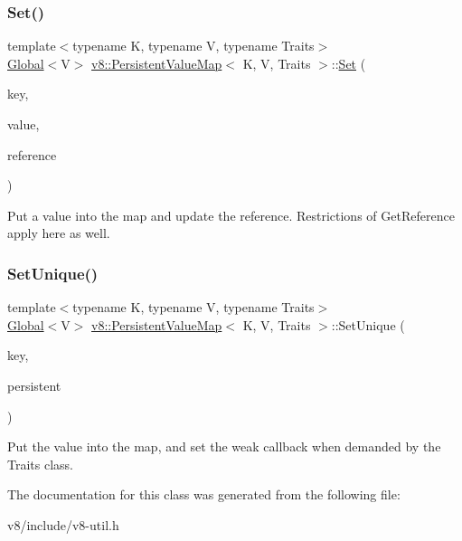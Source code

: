 \subsubsection{\texorpdfstring{Set()}{Set()}\hspace{0.1cm}{\footnotesize\ttfamily [3/3]}}
{\footnotesize\ttfamily template$<$typename K, typename V, typename Traits$>$ \\
\mbox{\hyperlink{classv8_1_1Global}{Global}}$<$V$>$ \mbox{\hyperlink{classv8_1_1PersistentValueMap}{v8\+::\+Persistent\+Value\+Map}}$<$ K, V, Traits $>$\+::\mbox{\hyperlink{classv8_1_1Set}{Set}} (\begin{DoxyParamCaption}\item[{const K \&}]{key,  }\item[{\mbox{\hyperlink{classv8_1_1Global}{Global}}$<$ V $>$}]{value,  }\item[{\mbox{\hyperlink{classv8_1_1PersistentValueMapBase_1_1PersistentValueReference}{Persistent\+Value\+Reference}} $\ast$}]{reference }\end{DoxyParamCaption})\hspace{0.3cm}{\ttfamily [inline]}}

Put a value into the map and update the reference. Restrictions of Get\+Reference apply here as well. \mbox{\label{classv8_1_1PersistentValueMap_a97ab74c7670e65dd5f95ec2940c4ab11}} 
\subsubsection{\texorpdfstring{Set\+Unique()}{SetUnique()}}
{\footnotesize\ttfamily template$<$typename K, typename V, typename Traits$>$ \\
\mbox{\hyperlink{classv8_1_1Global}{Global}}$<$V$>$ \mbox{\hyperlink{classv8_1_1PersistentValueMap}{v8\+::\+Persistent\+Value\+Map}}$<$ K, V, Traits $>$\+::Set\+Unique (\begin{DoxyParamCaption}\item[{const K \&}]{key,  }\item[{\mbox{\hyperlink{classv8_1_1Global}{Global}}$<$ V $>$ $\ast$}]{persistent }\end{DoxyParamCaption})\hspace{0.3cm}{\ttfamily [inline]}}

Put the value into the map, and set the \textquotesingle{}weak\textquotesingle{} callback when demanded by the Traits class. 

The documentation for this class was generated from the following file\+:\begin{DoxyCompactItemize}
\item 
v8/include/v8-\/util.\+h\end{DoxyCompactItemize}
